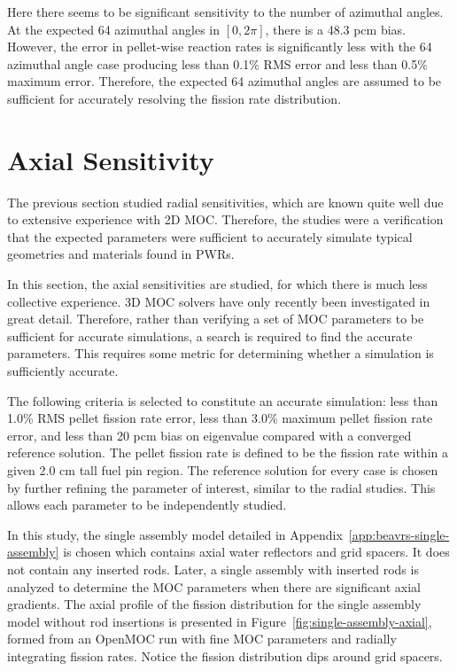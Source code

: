 Here there seems to be significant sensitivity to the number of azimuthal angles. At the expected 64 azimuthal angles in $[0, 2\pi]$, there is a 48.3 pcm bias. However, the error in pellet-wise reaction rates is significantly less with the 64 azimuthal angle case producing less than 0.1\% \ac{RMS} error and less than 0.5\% maximum error. Therefore, the expected 64 azimuthal angles are assumed to be sufficient for accurately resolving the fission rate distribution. 

\section{Axial Sensitivity}
\label{sec:axial-sensitivity}

The previous section studied radial sensitivities, which are known quite well due to extensive experience with 2D \ac{MOC}. Therefore, the studies were a verification that the expected parameters were sufficient to accurately simulate typical geometries and materials found in \acp{PWR}. 

In this section, the axial sensitivities are studied, for which there is much less collective experience. 3D \ac{MOC} solvers have only recently been investigated in great detail. Therefore, rather than verifying a set of \ac{MOC} parameters to be sufficient for accurate simulations, a search is required to find the accurate parameters. This requires some metric for determining whether a simulation is sufficiently accurate.

The following criteria is selected to constitute an accurate simulation: less than 1.0\% \ac{RMS} pellet fission rate error, less than 3.0\% maximum pellet fission rate error, and less than 20 pcm bias on eigenvalue compared with a converged reference solution. The pellet fission rate is defined to be the fission rate within a given 2.0 cm tall fuel pin region. The reference solution for every case is chosen by further refining the parameter of interest, similar to the radial studies. This allows each parameter to be independently studied.

In this study, the single assembly model detailed in Appendix~\ref{app:beavrs-single-assembly} is chosen which contains axial water reflectors and grid spacers. It does not contain any inserted rods. Later, a single assembly with inserted rods is analyzed to determine the \ac{MOC} parameters when there are significant axial gradients. The axial profile of the fission distribution for the single assembly model without rod insertions is presented in Figure~\ref{fig:single-assembly-axial}, formed from an OpenMOC run with fine \ac{MOC} parameters and radially integrating fission rates. Notice the fission distribution dips around grid spacers.

